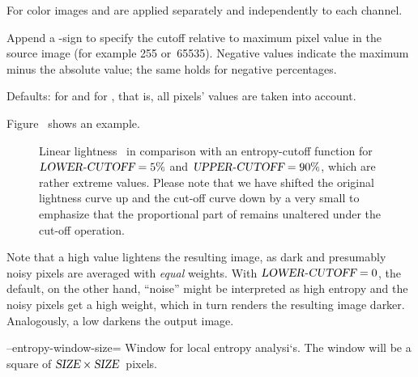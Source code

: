 \begin{codelist}
  For color images  and 
  are applied separately and independently to each channel.

  Append a \sample{\%}-sign to specify the cutoff relative to maximum
  pixel value in the source image (for example 255 or~65535).
  Negative  values indicate the maximum minus
  the absolute  value; the same holds for
  negative percentages.

  Defaults:  for
   and 
  for , that is, all pixels' values are taken
  into account.

  Figure~ shows an example.

  \begin{figure}[htbp]
    \begin{maxipage}
      \centering
    \end{maxipage}

    \caption[Entropy cutoff function]{Linear lightness~ in
      comparison with an entropy-cutoff function for
      $\textsl{LOWER-CUTOFF} = 5\%$ and $\textsl{UPPER-CUTOFF} =
      90\%$, which are rather extreme values.  Please note that we
      have shifted the original lightness curve up and the cut-off
      curve down by a very small  to emphasize that
      the proportional part of  remains unaltered under the
      cut-off operation.\label{fig:entropy-cutoff}}
  \end{figure}

  Note that a high  value lightens the resulting
  image, as dark and presumably noisy pixels are averaged with
  \emph{equal} weights.  With $\textsl{LOWER-CUTOFF} = 0$, the
  default, on the other hand, ``noise'' might be interpreted as high
  entropy and the noisy pixels get a high weight, which in turn
  renders the resulting image darker.  Analogously, a low
   darkens the output image.


  \label{opt:entropy-window-size}%
\item[--entropy-window-size=\metavar{SIZE}]\itemend
  Window  for local entropy analysi`s.  The window will
  be a square of $\textsl{SIZE} \times \textsl{SIZE}$~pixels.


\end{codelist}
